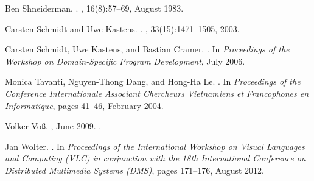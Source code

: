 \documentclass[a4paper]{article}
\begin{document}
\begin{thebibliography}{GMR98}
Ben Shneiderman.
.
, 16(8):57--69, August 1983.

Carsten Schmidt and Uwe Kastens.
.
, 33(15):1471--1505, 2003.

Carsten Schmidt, Uwe Kastens, and Bastian Cramer.
.
\newblock In {\em Proceedings of the Workshop on Domain-Specific Program
  Development}, July 2006.

Monica Tavanti, Nguyen-Thong Dang, and Hong-Ha Le.
.
\newblock In {\em Proceedings of the Conference Internationale Associant
  Chercheurs Vietnamiens et Francophones en Informatique}, pages 41--46,
  February 2004.

Volker Vo{\ss}.
,
  June 2009.
.

Jan Wolter.
.
\newblock In {\em Proceedings of the International Workshop on Visual Languages
  and Computing (VLC) in conjunction with the 18th International Conference on
  Distributed Multimedia Systems (DMS)}, pages 171--176, August 2012.

\end{thebibliography}
\end{document}
